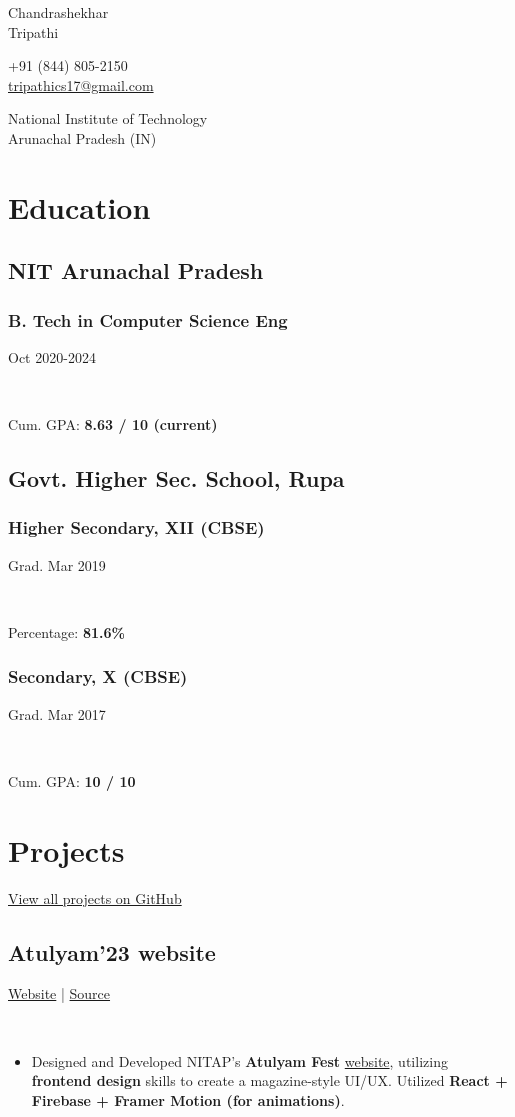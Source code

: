 \documentclass[]{article}
\newcommand{\namesection}[3]{
  \begin{multicols}{2}
    \begin{flushleft}
      \fontsize{30pt}{25pt}
      \fontspec[Path = fonts/ZillaSlab/]{ZillaSlab-Light}
      {{ #1 }\\{ #2 }}
      \columnbreak\\
    \end{flushleft}
    \begin{flushright}
      { #3 }
    \end{flushright}
  \end{multicols}
  \vspace{-8pt}
}
\newcommand{\subheading}[2]{
  {\subsection{#1}
  \hfill{#2}}\\
  \vspace{2pt}
}
\newcommand{\subsubheading}[2]{
  {\subsubsection{#1}
  \hfill \small#2} \\
  \vspace{2pt}
}
\newenvironment{tightemize}{
\vspace{-4pt}
\begin{itemize}
  \itemsep3pt \parskip0pt \parsep0pt}
{\end{itemize}\vspace{-\topsep}}
\begin{document}
\namesection{Chandrashekhar}{Tripathi}{+91 (844) 805-2150\\
  \href{mailto:tripathics17@gmail.com}{tripathics17@gmail.com}
  \par
  National Institute of Technology\\
  Arunachal Pradesh (IN)}

\noindent\makebox[\linewidth]{\color{light}\rule{\paperwidth}{0.2pt}}
\vspace{-5pt}

\begin{multicols}{2}
  \begin{flushleft}
    \section{Education}    
    \subsection{NIT Arunachal Pradesh}
    \subsubheading{B. Tech in Computer Science Eng}{Oct 2020-2024}
    Cum. GPA: \textbf{8.63 / 10 (current)}

    \subsection{Govt. Higher Sec. School, Rupa}
    \subsubheading{Higher Secondary, XII (CBSE)}{Grad. Mar 2019}
    Percentage: \textbf{81.6\%}

    \subsubheading{Secondary, X (CBSE)}{Grad. Mar 2017}
    Cum. GPA: \textbf{10 / 10}

    \section{Projects}

    \href{https://github.com/tripathics}{View all projects on GitHub}

    \subheading{Atulyam'23 website}{
      \href{https://atulyam23.com}{Website} | 
      \href{https://github.com/tripathics/atulyam-2023}{Source} 
    }
    \begin{tightemize}
      \item Designed and Developed NITAP's \textbf{Atulyam Fest} \href{https://atulyam23.com}{website}, utilizing \textbf{frontend design} skills to create a magazine-style UI/UX. Utilized \textbf{React + Firebase + Framer Motion (for animations)}.
    \end{tightemize}


\end{flushleft}
\end{multicols}
\end{document}

